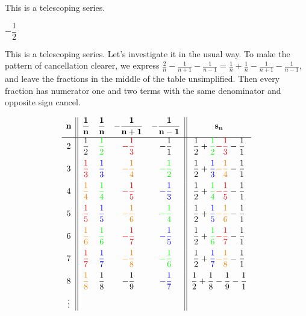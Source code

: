 \begin{hint}
This is a telescoping series.
\end{hint}
\begin{answer}
$-\dfrac12$
\end{answer}
\begin{solution}
This is a telescoping series. Let's investigate it in the usual way.
To make the pattern of cancellation clearer, we express 
$\frac{2}{n}-\frac{1}{n+1}-\frac{1}{n-1}=
\frac{1}{n}+\frac{1}{n}-\frac{1}{n+1}-\frac{1}{n-1}$,
and leave the fractions in the middle of the table unsimplified. Then every fraction has numerator one and two terms with the same denominator and opposite sign cancel.

\[\begin{array}{c||cccc||c}
\mathbf{n}&\mathbf{\dfrac{1}{n}}&\mathbf{\dfrac{1}{n}}&\mathbf{-\dfrac{1}{n+1}}&\mathbf{-\dfrac{1}{n-1}}&\mathbf{s_n}\\[7pt]
\hline
2&\dfrac{1}{2}&{\color{green}{\dfrac{1}{2}}}&{\color{red}{-\dfrac{1}{3}}}&-\dfrac{1}{1}&
               \dfrac{1}{2}+{\color{green}{\dfrac{1}{2}}} {\color{red}{-\dfrac{1}{3}}}-\dfrac{1}{1}\\[10pt]
3&{\color{red}{\dfrac{1}{3}}}&{\color{blue}{\dfrac{1}{3}}}&{\color{orange}{-\dfrac{1}{4}}}&{\color{green}{-\dfrac{1}{2}}}&
               \dfrac{1}{2}+{\color{blue}{\dfrac{1}{3}}}{\color{orange}{-\dfrac{1}{4}}}-\dfrac{1}{1}\\[10pt]
4&{\color{orange}{\dfrac{1}{4}}}&{\color{green}{\dfrac{1}{4}}}&{\color{red}{-\dfrac{1}{5}}}&{\color{blue}{-\dfrac{1}{3}}}&
               \dfrac{1}{2}+{\color{green}{\dfrac{1}{4}}} {\color{red}{-\dfrac{1}{5}}}-\dfrac{1}{1}\\[10pt]
5&{\color{red}{\dfrac{1}{5}}}&{\color{blue}{\dfrac{1}{5}}}&{\color{orange}{-\dfrac{1}{6}}}&{\color{green}{-\dfrac{1}{4}}}&
               \dfrac{1}{2}+{\color{blue}{\dfrac{1}{5}}}{\color{orange}{-\dfrac{1}{6}}}-\dfrac{1}{1}\\[10pt]
6&{\color{orange}{\dfrac{1}{6}}}&{\color{green}{\dfrac{1}{6}}}&{\color{red}{-\dfrac{1}{7}}}&{\color{blue}{-\dfrac{1}{5}}}&
               \dfrac{1}{2}+{\color{green}{\dfrac{1}{6}}}{\color{red}{-\dfrac{1}{7}}}-\dfrac{1}{1}\\[10pt]
7&{\color{red}{\dfrac{1}{7}}}&{\color{blue}{\dfrac{1}{7}}}&{\color{orange}{-\dfrac{1}{8}}}&{\color{green}{-\dfrac{1}{6}}}&
               \dfrac{1}{2}+{\color{blue}{\dfrac{1}{7}}} {\color{orange}{-\dfrac{1}{8}}}-\dfrac{1}{1}\\[10pt]
8&{\color{orange}{\dfrac{1}{8}}}&\dfrac{1}{8}&-\dfrac{1}{9}&{\color{blue}{-\dfrac{1}{7}}}&
               \dfrac{1}{2}+\dfrac{1}{8}-\dfrac{1}{9}-\dfrac{1}{1}\\[10pt]
\vdots&&&&
\end{array}\]



\end{solution}
